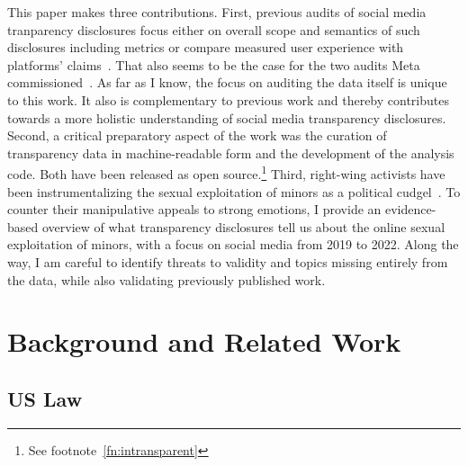 \documentclass[nonacm,screen]{acmart}
\newcommand\V[1]{\textsc{\MakeLowercase{#1}}}
\newcommand\hidden[1]{}
\begin{document}
This paper makes three contributions. First, previous audits of social media
tranparency disclosures focus either on overall scope and semantics of such
disclosures including metrics or compare measured user experience with
platforms' claims~\cite{AccessNow2021,CrockerGebhartea2019,Francoisdouek2021,
StoughtonRosenzweig2022,WagnerRozgonyiea2020}. That also seems to be the case
for the two audits Meta commissioned~\cite{BradfordGriselea2019,Meta2022,
Plumb2019,Sarang2022}. As far as I know, the focus on auditing the data itself
is unique to this work. It also is complementary to previous work and thereby
contributes towards a more holistic understanding of social media transparency
disclosures. Second, a critical preparatory aspect of the work was the curation
of transparency data in machine-readable form and the development of the
analysis code. Both have been released as open source.\footnote{See
footnote~\ref{fn:intransparent}} Third, right-wing activists have been
instrumentalizing the sexual exploitation of minors as a political
cudgel~\cite{BuntainBarlowea2022,Feffer2021,Gilbert2023, Romano2022}. To counter
their manipulative appeals to strong emotions, I provide an evidence-based
overview of what transparency disclosures tell us about the online sexual
exploitation of minors, with a focus on social media from 2019 to 2022. Along
the way, I am careful to identify threats to validity and topics missing
entirely from the data, while also validating previously published work.

\hidden{
I discuss legal background and related work in Section~\ref{sec:background}.
Next, I introduce surveyed platforms and then present my audit findings in
Section~\ref{sec:audits}. I present the evidence-based overview of the spread of
\V{CSAM} across the internet in Section~\ref{sec:global-spread}. Finally, I
discuss the results in Section~\ref{sec:discussion} and conclude with
Section~\ref{sec:outlook}.
}



\section{Background and Related Work}
\label{sec:background}

\subsection{US Law}
\end{document}
